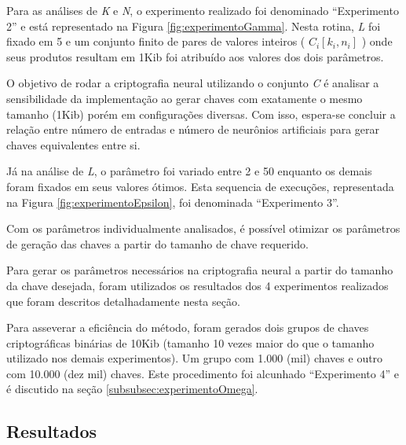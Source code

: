 \documentclass[a4paper,10pt,oneside,conference,final,keeplastbox]{inatel}
\begin{document}
            Para as análises de \textit{K} e \textit{N}, o experimento realizado foi denominado ``Experimento 2'' e está representado na Figura \ref{fig:experimentoGamma}. Nesta rotina, \textit{L} foi fixado em 5 e um conjunto finito de pares de valores inteiros ( $C_i [k_i, n_i]$ ) onde seus produtos resultam em 1Kib foi atribuído aos valores dos dois parâmetros.

            

            O objetivo de rodar a criptografia neural utilizando o conjunto \textit{C} é analisar a sensibilidade da implementação ao gerar chaves com exatamente o mesmo tamanho (1Kib) porém em configurações diversas. Com isso, espera-se concluir a relação entre número de entradas e número de neurônios artificiais para gerar chaves equivalentes entre si.
            
            Já na análise de \textit{L}, o parâmetro foi variado entre 2 e 50 enquanto os demais foram fixados em seus valores ótimos. Esta sequencia de execuções, representada na Figura \ref{fig:experimentoEpsilon}, foi denominada ``Experimento 3''.
            
            

            Com os parâmetros individualmente analisados, é possível otimizar os parâmetros de geração das chaves a partir do tamanho de chave requerido.

            Para gerar os parâmetros necessários na criptografia neural a partir do tamanho da chave desejada, foram utilizados os resultados dos 4 experimentos realizados que foram descritos detalhadamente nesta seção.
            
            Para asseverar a eficiência do método, foram gerados dois grupos de chaves criptográficas binárias de 10Kib (tamanho 10 vezes maior do que o tamanho utilizado nos demais experimentos). Um grupo com 1.000 (mil) chaves e outro com 10.000 (dez mil) chaves. Este procedimento foi alcunhado ``Experimento 4'' e é discutido na seção \ref{subsubsec:experimentoOmega}.

        \subsection{Resultados}
        \label{subsec:resultados}
\end{document}
